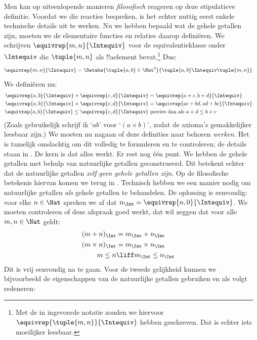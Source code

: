 \documentclass[../../../include/open-logic-section]{subfiles}
\begin{document}
Men kan op uiteenlopende manieren \emph{filosofisch} reageren op deze
stipulatieve definitie. Voordat we die reacties bespreken, is het echter
nuttig eerst enkele technische details uit te werken.
Nu we hebben bepaald wat de gehele getallen zijn, moeten we de elementaire
functies en relaties daarop definiëren. We schrijven
$\equivrep{m, n}{\Intequiv}$ voor de equivalentieklasse onder
$\Intequiv$ die $\tuple{m, n}$ als !!a{element} bevat.\footnote{Met de
in  ingevoerde notatie
zouden we hiervoor $\equivrep{\tuple{m,n}}{\Intequiv}$ hebben
geschreven. Dat is echter iets moeilijker leesbaar.} Dus:
	$$\equivrep{m, n}{\Intequiv} = \Setabs{\tuple{a, b} \in \Nat^2}{\tuple{a, b}\Intequiv \tuple{m, n}}$$
We definiëren nu:
	\begin{align*}
		\equivrep{a, b}{\Intequiv} + \equivrep{c, d}{\Intequiv} &= \equivrep{a + c, b + d}{\Intequiv}\\
		\equivrep{a, b}{\Intequiv} \times \equivrep{c, d}{\Intequiv} &= \equivrep{a c + b  d, a  d + b c}{\Intequiv}\\
		\equivrep{a, b}{\Intequiv} \leq \equivrep{c, d}{\Intequiv} &\text{ precies dan als }a + d \leq b + c
	\end{align*}	
(Zoals gebruikelijk schrijf ik `$ab$' voor `$(a \times b)$', zodat de
axioma's gemakkelijker leesbaar zijn.) We moeten nu nagaan of deze
definities naar behoren \emph{werken}. Het
is tamelijk omslachtig om dit volledig te formuleren en te controleren;
de details staan in . De kern is dat alles werkt.
Er rest nog één punt. We hebben de gehele getallen met behulp van
natuurlijke getallen geconstrueerd. Dit betekent echter dat de
natuurlijke getallen \emph{zelf geen gehele getallen zijn}. Op de
filosofische betekenis hiervan komen we terug in .
Technisch hebben we een manier nodig om natuurlijke getallen
\emph{als} gehele getallen te behandelen. De oplossing is eenvoudig:
voor elke $n \in \Nat$ spreken we af dat $n_\Int =
\equivrep{n, 0}{\Intequiv}$. We
moeten controleren of deze afspraak goed werkt, dat wil
zeggen dat voor alle $m, n \in \Nat$ geldt:
\begin{align*}
	(m + n)_\Int &= m_\Int + n_\Int\\
	(m \times n)_\Int &= m_\Int \times n_\Int\\
	m \leq n &\liff m_\Int \leq n_\Int
\end{align*}
Dit is vrij eenvoudig na te gaan. Voor de tweede gelijkheid
kunnen we bijvoorbeeld de eigenschappen van de natuurlijke getallen
gebruiken en als volgt redeneren:
\end{document}
